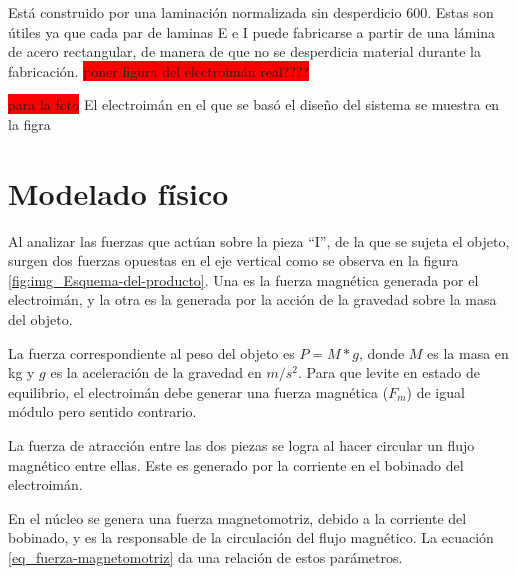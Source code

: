 \noindent Está construido por una laminación normalizada sin desperdicio 600. Estas son útiles ya que cada par de laminas E e I puede fabricarse a partir de una lámina de acero rectangular, de manera de que no se desperdicia material durante la fabricación. 
\colorbox{red}{poner figura del electroimán real????}

\noindent \colorbox{red}{para la foto} El electroimán en el que se basó el diseño del sistema se muestra en la figra

\section{Modelado físico}

\noindent Al analizar las fuerzas que actúan sobre la pieza ``I'', de la que se sujeta el objeto, surgen dos fuerzas opuestas en el eje vertical como se observa en la figura \ref{fig:img_Esquema-del-producto}. Una es la fuerza magnética generada por el electroimán, y la otra es la generada por la acción de la gravedad sobre la masa del objeto. 
 

\noindent La fuerza correspondiente al peso del objeto es $P=M*g$, donde $M$ es la masa en kg y $g$ es la aceleración de la gravedad en $m/s^2$. Para que levite en estado de equilibrio, el electroimán debe generar una fuerza magnética ($F_{m}$) de igual módulo pero sentido contrario.

\noindent La fuerza de atracción entre las dos piezas se logra al hacer circular un flujo magnético entre ellas. Este es generado por la corriente en el bobinado del electroimán.

\noindent En el núcleo se genera una fuerza magnetomotriz, debido a la corriente del bobinado, y es la responsable de la circulación del flujo magnético. La ecuación \ref{eq_fuerza-magnetomotriz} da una relación de estos parámetros.	


